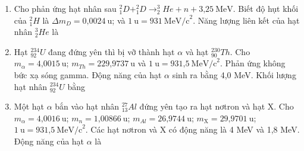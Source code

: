 \begin{enumerate}
	\item {Cho phản ứng hạt nhân sau $^2_1D+^2_1D \longrightarrow ^3_2He + n + \text{3,25}\ \text{MeV}$. Biết độ hụt khối của $^2_1H$ là $\Delta m_D = \text{0,0024}\ \text{u}$; và $1\ \text{u} = 931\ \text{MeV/c}^2$. Năng lượng liên kết của hạt nhân $^3_2He$ là
	}
	\item {Hạt $^{234}_{92}U$ đang đứng yên thì bị vỡ thành hạt $\alpha$ và hạt $^{230}_{90}Th$. Cho $m_{\alpha}=\text{4,0015}\ \text{u}$; $m_{Th}=\text{229,9737}\ \text{u}$ và $1\ \text{u} = \text{931,5}\ \text{MeV/c}^2$. Phản ứng không bức xạ sóng gamma. Động năng của hạt $\alpha$ sinh ra bằng 4,0 MeV. Khối lượng hạt nhân $^{234}_{92} U$ bằng
	}
	\item {Một hạt $\alpha$ bắn vào hạt nhân $^{27}_{13}Al$ đứng yên tạo ra hạt nơtron và hạt X. Cho $m_{\alpha}= \text{4,0016}\ \text{u}$; $m_n = \text{1,00866}\ \text{u}$; $m_{Al} = \text{26,9744}\ \text{u}$; $m_{\text{X}} =\text{29,9701}\ \text{u}$; $1\ \text{u} = \text{931,5}\ \text{MeV/c}^2$. Các hạt nơtron và X có động năng là 4 MeV và 1,8 MeV. Động năng của hạt $\alpha$ là
		
}
\end{enumerate}
